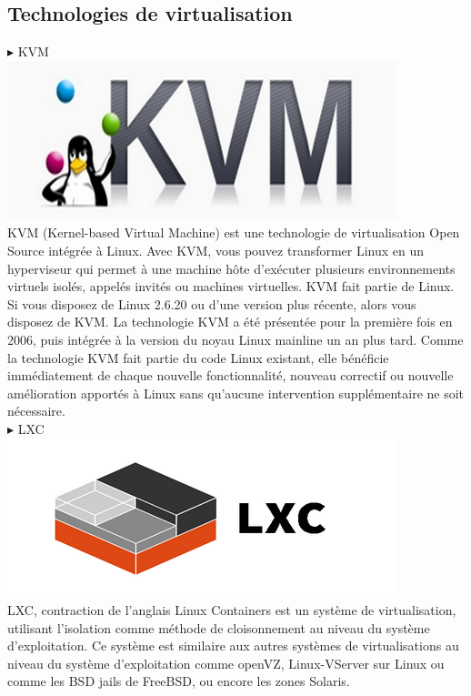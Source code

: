 \documentclass[a4paper, 12pt]{report}
\begin{document}
\subsection{Technologies de virtualisation}
\noindent $\blacktriangleright$ KVM
\\
\includegraphics{img/outils/11}
\\
\noindent KVM (Kernel-based Virtual Machine) est une technologie de virtualisation Open Source intégrée à Linux. Avec KVM, vous pouvez transformer Linux en un hyperviseur qui permet à une machine hôte d'exécuter plusieurs environnements virtuels isolés, appelés invités ou machines virtuelles.
KVM fait partie de Linux. Si vous disposez de Linux 2.6.20 ou d'une version plus récente, alors vous disposez de KVM. La technologie KVM a été présentée pour la première fois en 2006, puis intégrée à la version du noyau Linux mainline un an plus tard. Comme la technologie KVM fait partie du code Linux existant, elle bénéficie immédiatement de chaque nouvelle fonctionnalité, nouveau correctif ou nouvelle amélioration apportés à Linux sans qu'aucune intervention supplémentaire ne soit nécessaire. 
\\
\noindent $\blacktriangleright$ LXC 
\\
\includegraphics{img/outils/12}
\\
\noindent LXC, contraction de l’anglais Linux Containers est un système de virtualisation, utilisant l’isolation comme méthode de cloisonnement au niveau du système d’exploitation.
Ce système est similaire aux autres systèmes de virtualisations au niveau du système d’exploitation comme openVZ, Linux-VServer sur Linux ou comme les BSD jails de FreeBSD, ou encore les zones Solaris.
\end{document}
